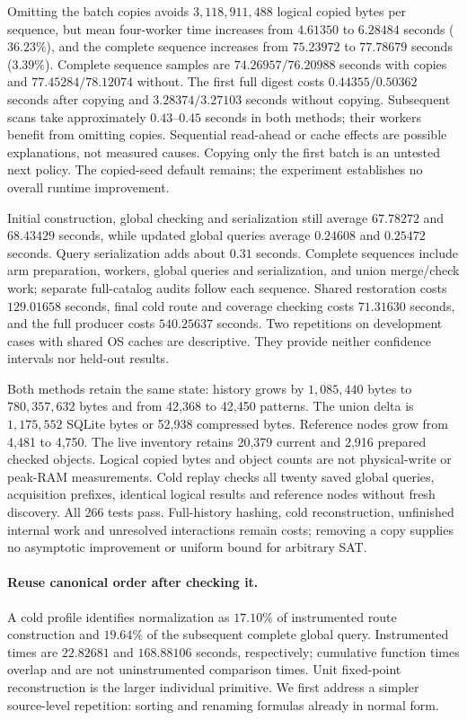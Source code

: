 \documentclass[11pt,a4paper]{article}
\numberwithin{equation}{section}
\theoremstyle{plain}
\theoremstyle{definition}
\theoremstyle{remark}
\begin{document}
Omitting the batch copies avoids $3{,}118{,}911{,}488$ logical copied bytes per
sequence, but mean four-worker time increases from $4.61350$ to $6.28484$ seconds
($36.23\%$), and the complete sequence increases from $75.23972$ to $77.78679$
seconds ($3.39\%$). Complete sequence samples are $74.26957/76.20988$ seconds
with copies and $77.45284/78.12074$ without. The first full digest costs
$0.44355/0.50362$ seconds after copying and $3.28374/3.27103$ seconds without
copying. Subsequent scans take approximately $0.43$--$0.45$ seconds in both
methods; their workers benefit from omitting copies. Sequential read-ahead or
cache effects are possible explanations, not measured causes. Copying only
the first batch is an untested next policy. The copied-seed default remains;
the experiment establishes no overall runtime improvement.

Initial construction, global checking and serialization still average
$67.78272$ and $68.43429$ seconds, while updated global queries average
$0.24608$ and $0.25472$ seconds. Query serialization adds about $0.31$ seconds.
Complete sequences include arm preparation, workers, global queries and
serialization, and union merge/check work; separate full-catalog audits follow
each sequence. Shared restoration costs $129.01658$ seconds, final cold route
and coverage checking costs $71.31630$ seconds, and the full producer costs
$540.25637$ seconds. Two repetitions on development cases with shared OS caches
are descriptive. They provide neither confidence intervals nor held-out results.

Both methods retain the same state: history grows by $1{,}085{,}440$ bytes to
$780{,}357{,}632$ bytes and from 42,368 to 42,450 patterns. The union delta is
$1{,}175{,}552$ SQLite bytes or 52,938 compressed bytes. Reference nodes grow
from 4,481 to 4,750. The live inventory retains 20,379 current and 2,916 prepared
checked objects. Logical copied bytes and object counts are not physical-write
or peak-RAM measurements. Cold replay checks all twenty saved global queries,
acquisition prefixes, identical logical results and reference nodes without
fresh discovery. All 266 tests pass. Full-history hashing, cold reconstruction,
unfinished internal work and unresolved interactions remain costs; removing
a copy supplies no asymptotic improvement or uniform bound for arbitrary SAT.

\paragraph{Reuse canonical order after checking it.}
A cold profile identifies normalization as $17.10\%$ of instrumented route
construction and $19.64\%$ of the subsequent complete global query. Instrumented
times are $22.82681$ and $168.88106$ seconds, respectively; cumulative function
times overlap and are not uninstrumented comparison times. Unit fixed-point
reconstruction is the larger individual primitive. We first address a simpler
source-level repetition: sorting and renaming formulas already in normal form.
\end{document}
